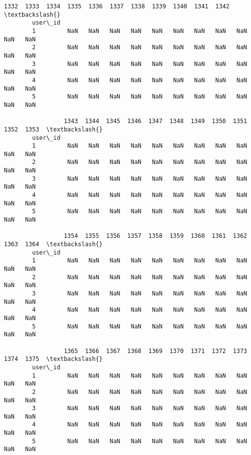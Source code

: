 \documentclass[11pt]{article}
\begin{document}
\begin{Verbatim}[commandchars=\\\{\}]
                 1332  1333  1334  1335  1336  1337  1338  1339  1340  1341  1342  \textbackslash{}
        user\_id                                                                     
        1         NaN   NaN   NaN   NaN   NaN   NaN   NaN   NaN   NaN   NaN   NaN   
        2         NaN   NaN   NaN   NaN   NaN   NaN   NaN   NaN   NaN   NaN   NaN   
        3         NaN   NaN   NaN   NaN   NaN   NaN   NaN   NaN   NaN   NaN   NaN   
        4         NaN   NaN   NaN   NaN   NaN   NaN   NaN   NaN   NaN   NaN   NaN   
        5         NaN   NaN   NaN   NaN   NaN   NaN   NaN   NaN   NaN   NaN   NaN   
        
                 1343  1344  1345  1346  1347  1348  1349  1350  1351  1352  1353  \textbackslash{}
        user\_id                                                                     
        1         NaN   NaN   NaN   NaN   NaN   NaN   NaN   NaN   NaN   NaN   NaN   
        2         NaN   NaN   NaN   NaN   NaN   NaN   NaN   NaN   NaN   NaN   NaN   
        3         NaN   NaN   NaN   NaN   NaN   NaN   NaN   NaN   NaN   NaN   NaN   
        4         NaN   NaN   NaN   NaN   NaN   NaN   NaN   NaN   NaN   NaN   NaN   
        5         NaN   NaN   NaN   NaN   NaN   NaN   NaN   NaN   NaN   NaN   NaN   
        
                 1354  1355  1356  1357  1358  1359  1360  1361  1362  1363  1364  \textbackslash{}
        user\_id                                                                     
        1         NaN   NaN   NaN   NaN   NaN   NaN   NaN   NaN   NaN   NaN   NaN   
        2         NaN   NaN   NaN   NaN   NaN   NaN   NaN   NaN   NaN   NaN   NaN   
        3         NaN   NaN   NaN   NaN   NaN   NaN   NaN   NaN   NaN   NaN   NaN   
        4         NaN   NaN   NaN   NaN   NaN   NaN   NaN   NaN   NaN   NaN   NaN   
        5         NaN   NaN   NaN   NaN   NaN   NaN   NaN   NaN   NaN   NaN   NaN   
        
                 1365  1366  1367  1368  1369  1370  1371  1372  1373  1374  1375  \textbackslash{}
        user\_id                                                                     
        1         NaN   NaN   NaN   NaN   NaN   NaN   NaN   NaN   NaN   NaN   NaN   
        2         NaN   NaN   NaN   NaN   NaN   NaN   NaN   NaN   NaN   NaN   NaN   
        3         NaN   NaN   NaN   NaN   NaN   NaN   NaN   NaN   NaN   NaN   NaN   
        4         NaN   NaN   NaN   NaN   NaN   NaN   NaN   NaN   NaN   NaN   NaN   
        5         NaN   NaN   NaN   NaN   NaN   NaN   NaN   NaN   NaN   NaN   NaN   
        

\end{Verbatim}
\end{document}
